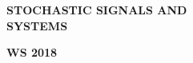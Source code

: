 \begin{center}
%
\begin{figure}[H]
{\centering {}\par}
\end{figure}
\vspace{0.2cm}
\bfseries{STOCHASTIC SIGNALS AND\\SYSTEMS}\\
\vspace{1.1cm}
\begin{large}
\bfseries{ WS 2018}\\
\end{large}
\vspace{1.0cm}
\begin{figure}[H]
{\centering {}\par}
\end{figure}

\end{center}
